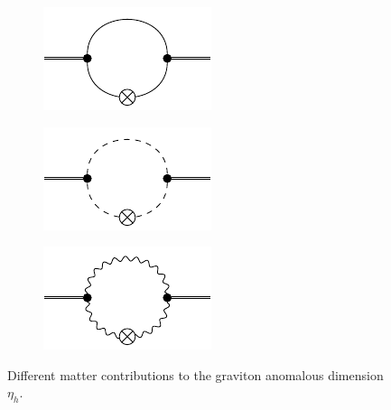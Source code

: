  \begin{figure}[t]
 \centering
 \hfill
 \begin{subfigure}{0.3\textwidth} 
	\includegraphics[width=\textwidth]{figs/TikZ/fermion_contribution}
 \end{subfigure}
 \hfill
 \begin{subfigure}{0.3\textwidth} 
 	\includegraphics[width=\textwidth]{figs/TikZ/scalar_contribution}
 \end{subfigure} 
 \hfill
 \begin{subfigure}{0.3\textwidth} 
 	\includegraphics[width=\textwidth]{figs/TikZ/gauge_field_contribution}
 \end{subfigure} 
 \hfill
 \caption{Different matter contributions to the graviton anomalous dimension $\eta_h$.}	
 \end{figure}
 

